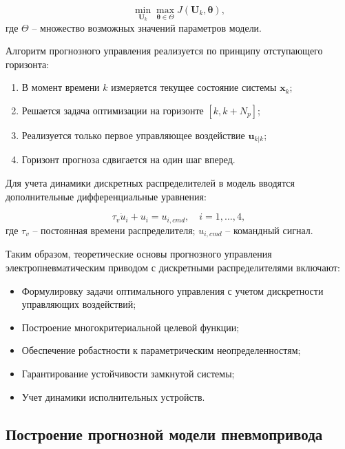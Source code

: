 \begin{equation}
	\min_{\mathbf{U}_k} \max_{\boldsymbol{\theta} \in \Theta} J(\mathbf{U}_k, \boldsymbol{\theta}),
\end{equation}
где $\Theta$ -- множество возможных значений параметров модели.

Алгоритм прогнозного управления реализуется по принципу отступающего горизонта:

\begin{enumerate}
	\item  В момент времени $k$ измеряется текущее состояние системы $\mathbf{x}_k$;
	\item  Решается задача оптимизации на горизонте $[k, k+N_p]$;
	\item  Реализуется только первое управляющее воздействие $\mathbf{u}_{k|k}$;
	\item  Горизонт прогноза сдвигается на один шаг вперед.

\end{enumerate}

Для учета динамики дискретных распределителей в модель вводятся дополнительные дифференциальные уравнения:

\begin{equation}
	\tau_v\dot{u}_i + u_i = u_{i,cmd}, \quad i = 1,\ldots,4,
\end{equation}
где $\tau_v$ -- постоянная времени распределителя;
$u_{i,cmd}$ -- командный сигнал.

Таким образом, теоретические основы прогнозного управления электропневматическим приводом с дискретными распределителями включают:

\begin{itemize}
	\item Формулировку задачи оптимального управления с учетом дискретности управляющих воздействий;
	\item Построение многокритериальной целевой функции;
	\item Обеспечение робастности к параметрическим неопределенностям;
	\item Гарантирование устойчивости замкнутой системы;
	\item Учет динамики исполнительных устройств.

\end{itemize}
\subsection{Построение прогнозной модели пневмопривода}\label{subsec:ch3/sec5/sub2}

